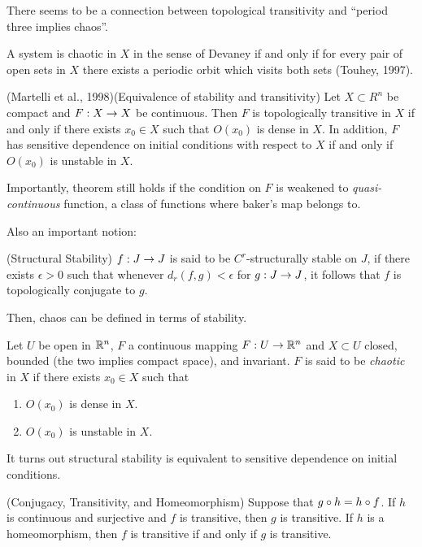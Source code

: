 \documentclass[11pt]{article}
\begin{document}
There seems to be a connection between topological transitivity and
``period three implies chaos''.

A system is chaotic in $X$ in the sense of Devaney if and only if
for every pair of open sets in $X$ there exists a periodic orbit 
which visits both sets (Touhey, 1997).

\begin{proposition}
  (Martelli et al., 1998)(Equivalence of stability and transitivity)
  Let $X\subset R^n$ be compact and $F: X\rightarrow X$ be continuous.
  Then $F$ is topologically transitive in $X$ if and only if
  there exists $x_0\in X$ such that $O(x_0)$ is dense in $X$.
  In addition, $F$ has sensitive dependence on initial conditions 
  with respect to $X$ if and only if $O(x_0)$ is unstable in $X$.
\end{proposition}

Importantly, theorem still holds if the condition on $F$ is 
weakened to {\it quasi-continuous} function, a class of functions
where baker's map belongs to.

Also an important notion:
\begin{definition}
  (Structural Stability) $f: J \rightarrow J$ is said to be $C^r$-structurally
  stable on $J$, if there exists $\epsilon > 0$ such that whenever
  $d_r(f,g) < \epsilon$ for $g: J\rightarrow J$, it follows that $f$
  is topologically conjugate to $g$.
\end{definition}

Then, chaos can be defined in terms of stability.
\begin{definition}
  Let $U$ be open in $\mathbb{R}^n$, $F$ a continuous mapping $F: U\rightarrow \mathbb{R}^n$ and $X\subset U$
  closed, bounded (the two implies compact space), and invariant.
  $F$ is said to be {\it chaotic} in $X$ if there exists $x_0\in X$
  such that
  \begin{enumerate}
    \item $O(x_0)$ is dense in $X$.
    \item $O(x_0)$ is unstable in $X$.
  \end{enumerate}
\end{definition}

It turns out structural stability is equivalent to sensitive dependence
on initial conditions.

\begin{proposition}
  (Conjugacy, Transitivity, and Homeomorphism) 
  Suppose that $g \circ h = h \circ f$. If $h$ is continuous and
  surjective and $f$ is transitive, then $g$ is transitive.
  If $h$ is a homeomorphism, then $f$ is transitive if and only if
  $g$ is transitive.
\end{proposition}
\end{document}
